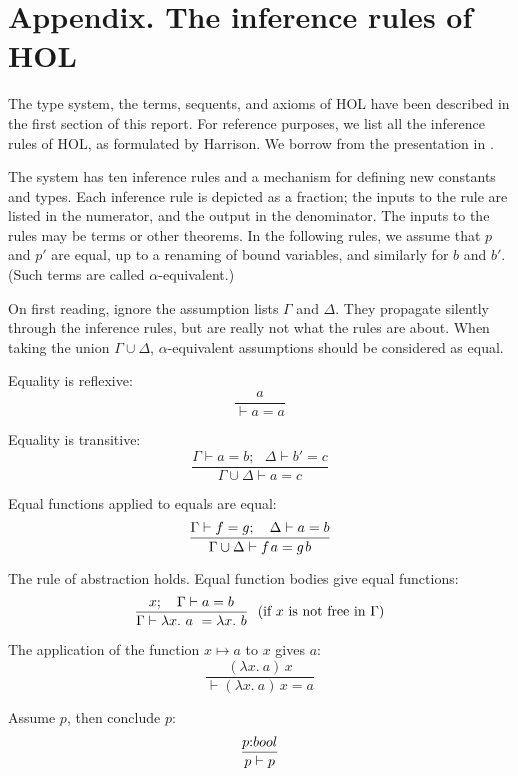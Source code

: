 \documentclass[brochure,english,12pt]{bourbaki}
\theoremstyle{plain}
\def\tc{\hbox{:}}
\begin{document}
\section{Appendix. The inference rules of HOL}

The type system, the terms, sequents, and axioms of HOL have been
described in the first section of this report.  For reference purposes, we list
all the inference rules of HOL, as formulated by Harrison.  We borrow from
the presentation in \cite{Hales:2008:formal}.

The system has ten inference rules and a mechanism for defining new
constants and types. Each inference rule is depicted as a fraction;
the inputs to the rule are listed in the numerator, and the output in
the denominator.  The inputs to the rules may be terms or other
theorems.  In the following rules, we assume that $p$ and $p'$ are
equal, up to a renaming of bound variables, and similarly for $b$ and
$b'$.  (Such terms are called $\alpha$-equivalent.)

\quad On first reading, ignore the assumption lists $\Gamma$ and
$\Delta$. They propagate silently through the inference rules, but are
really not what the rules are about.  When taking the union
$\Gamma\cup\Delta$, $\alpha$-equivalent assumptions should be
considered as equal.  \smallskip


\smallskip

\noindent
Equality is reflexive:
$$
\frac{a}{\vdash a=a}
$$

\noindent
Equality is transitive:
$$
\frac{\Gamma \vdash a=b;~~~\Delta\vdash b'=c}
{\Gamma\cup\Delta \vdash a=c}
$$

\noindent
Equal functions applied to equals are equal:
$$
\frac{\Gamma\vdash f=g;~~~\Delta\vdash a=b}
{\Gamma\cup\Delta\vdash f\hskip0.1em a = g\hskip0.1em b}
$$

\noindent
The rule of abstraction holds. Equal function bodies
give equal functions:
$$
\frac{x;~~~\Gamma\vdash a=b}
{\Gamma \vdash \lambda x.\ a~=\lambda x.\ b}
~\hbox{\ (if $x$ is not free in $\Gamma$)}
$$

\noindent
The application of the function $x\mapsto a$ to $x$ gives $a$:
$$
\frac{(\lambda x.~a)\, x}
{\vdash (\lambda x.\ a)\, x = a}
$$




\noindent
Assume $p$, then conclude $p$:
$$
\frac{p\tc bool}
{p \vdash p}
$$
\end{document}
